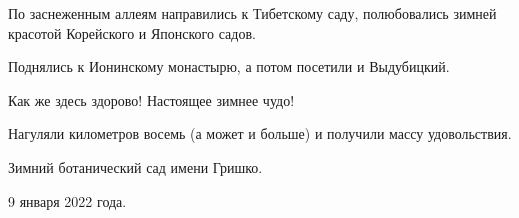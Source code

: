 По заснеженным аллеям  направились к Тибетскому саду, полюбовались зимней
красотой Корейского и Японского садов.


Поднялись к Ионинскому монастырю, а потом посетили и Выдубицкий.

Как же здесь здорово! Настоящее зимнее чудо!

Нагуляли километров восемь (а может и больше)  и получили массу удовольствия.

Зимний ботанический сад имени Гришко.

9 января 2022 года.

